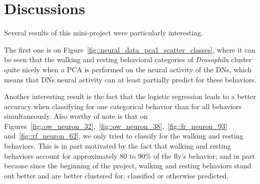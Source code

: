 \section{Discussions}

Several results of this mini-project were particularly interesting.

\vspace{\baselineskip}

The first one is on Figure~\ref{fig::neural_data_pca1_scatter_classes}, where it can be seen that the walking and resting behavioral categories of \textit{Drosophila} cluster quite nicely when a PCA is performed on the neural activity of the DNs, which means that DNs neural activity can at least partially predict for these behaviors.

\vspace{\baselineskip}

Another interesting result is the fact that the logistic regression leads to a better accuracy when classifying for one categorical behavior than for all behaviors simultaneously.
Also worthy of note is that on Figures~\ref{fig::ow_neuron_32},~\ref{fig::ow_neuron_38},~\ref{fig::fr_neuron_93} and~\ref{fig::rf_neuron_62}, we only tried to classify for the walking and resting behaviors.
This is in part motivated by the fact that walking and resting behaviors account for approximately 80 to 90\% of the fly's behavior; and in part because since the beginning of the project, walking and resting behaviors stand out better and are better clustered for, classified or otherwise predicted.

\newpage

